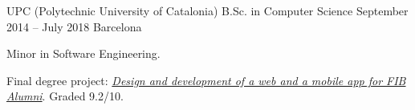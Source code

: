 

\begin{cventries}

  \cventry
    {UPC (Polytechnic University of Catalonia)} %
    {B.Sc. in Computer Science} %
    {September 2014 – July 2018} %
    {Barcelona} %
    {
      \begin{cvitems} %
        \item {Minor in Software Engineering.}
        \item {Final degree project: \textit{\href{https://upcommons.upc.edu/handle/2117/121975}{Design and development of a web and a mobile app for FIB Alumni}}. Graded 9.2/10.}
      \end{cvitems}
    }


\end{cventries}
